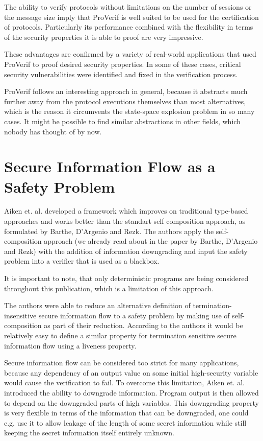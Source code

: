 \documentclass[a4paper,UKenglish]{lipics-v2018}
\begin{document}
The ability to verify protocols without limitations on the number of sessions or the message size imply that ProVerif is well suited to be used for the certification of protocols. Particularly its performance combined with the flexibility in terms of the security properties it is able to proof are very impressive.\cite{ProVerif}

These advantages are confirmed by a variety of real-world applications that used ProVerif to proof desired security properties. In some of  these cases, critical security vulnerabilities were identified and fixed in the verification process.

ProVerif follows an interesting approach in general, because it abstracts much further away from the protocol executions themselves than most alternatives, which is the reason it circumvents the state-space explosion problem in so many cases. It might be possible to find similar abstractions in other fields, which nobody has thought of by now.




\section{Secure Information Flow as a Safety Problem}

Aiken et. al. developed a framework which improves on traditional type-based approaches and works better than the standart self composition approach, as formulated by Barthe, D'Argenio and Rezk.\cite{information_flow_by_self_composition}
The authors apply the self-composition approach (we already read about in the paper by Barthe, D'Argenio and Rezk) with the addition of information downgrading and input the safety problem into a verifier that is used as a blackbox.\cite{secure_information_flow_safety}

It is important to note, that only deterministic programs are being considered throughout this publication, which is a limitation of this approach.

The authors were able to reduce an alternative definition of termination-insensitive secure information flow to a safety problem by making use of self-composition as part of their reduction. According to the authors it would be relatively easy to define a similar property for termination sensitive secure information flow using a liveness property.\cite{secure_information_flow_safety}

Secure information flow can be considered too strict for many applications, because any dependency of an output value on some initial high-security variable would cause the verification to fail. To overcome this limitation, Aiken et. al. introduced the ability to downgrade information. Program output is then allowed to depend on the downgraded parts of high variables. This downgrading property is very flexible in terms of the information that can be downgraded, one could e.g. use it to allow leakage of the length of some secret information while still keeping the secret information itself entirely unknown.\cite{secure_information_flow_safety}
\end{document}
